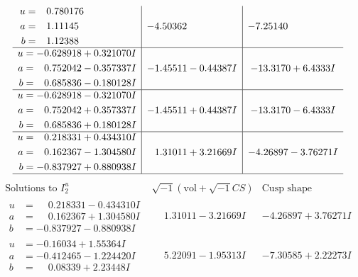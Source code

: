 \documentclass[1p]{elsarticle_modified}
\theoremstyle{definition}
\newcommand{\I}{\sqrt{-1}}
\begin{document}
$$\begin{array}{c|c|c}
\begin{aligned}
u &= \phantom{-}0.780176\phantom{ +0.000000I} \\
a &= \phantom{-}1.11145\phantom{ +0.000000I} \\
b &= \phantom{-}1.12388\phantom{ +0.000000I}\end{aligned}
 & -4.50362\phantom{ +0.000000I} & -7.25140\phantom{ +0.000000I} \\ \hline\begin{aligned}
u &= -0.628918 + 0.321070 I \\
a &= \phantom{-}0.752042 - 0.357337 I \\
b &= \phantom{-}0.685836 - 0.180128 I\end{aligned}
 & -1.45511 - 0.44387 I & -13.3170 + 6.4333 I \\ \hline\begin{aligned}
u &= -0.628918 - 0.321070 I \\
a &= \phantom{-}0.752042 + 0.357337 I \\
b &= \phantom{-}0.685836 + 0.180128 I\end{aligned}
 & -1.45511 + 0.44387 I & -13.3170 - 6.4333 I \\ \hline\begin{aligned}
u &= \phantom{-}0.218331 + 0.434310 I \\
a &= \phantom{-}0.162367 - 1.304580 I \\
b &= -0.837927 + 0.880938 I\end{aligned}
 & \phantom{-}1.31011 + 3.21669 I & -4.26897 - 3.76271 I\\
 \hline 
 \end{array}$$\newpage$$\begin{array}{c|c|c}  
\text{Solutions to }I^u_{2}& \I (\text{vol} + \sqrt{-1}CS) & \text{Cusp shape}\\
 \hline 
\begin{aligned}
u &= \phantom{-}0.218331 - 0.434310 I \\
a &= \phantom{-}0.162367 + 1.304580 I \\
b &= -0.837927 - 0.880938 I\end{aligned}
 & \phantom{-}1.31011 - 3.21669 I & -4.26897 + 3.76271 I \\ \hline\begin{aligned}
u &= -0.16034 + 1.55364 I \\
a &= -0.412465 - 1.224420 I \\
b &= \phantom{-}0.08339 + 2.23448 I\end{aligned}
 & \phantom{-}5.22091 - 1.95313 I & -7.30585 + 2.22273 I \\ \hline\begin{aligned}

\end{aligned}
\end{array}$$
\end{document}
